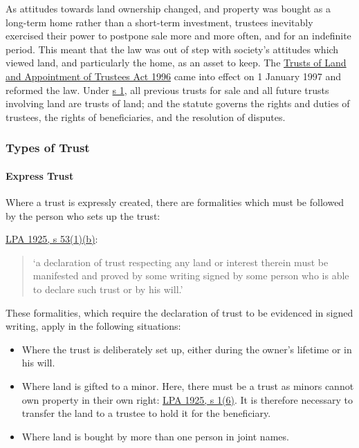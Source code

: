 \documentclass[
]{article}
\providecommand{\tightlist}{%
  \setlength{\itemsep}{0pt}\setlength{\parskip}{0pt}}
\begin{document}
As attitudes towards land ownership changed, and property was bought as
a long-term home rather than a short-term investment, trustees
inevitably exercised their power to postpone sale more and more often,
and for an indefinite period. This meant that the law was out of step
with society's attitudes which viewed land, and particularly the home,
as an asset to keep. The
\href{https://www.legislation.gov.uk/ukpga/1996/47/contents}{Trusts of
Land and Appointment of Trustees Act 1996} came into effect on 1 January
1997 and reformed the law. Under
\href{https://www.legislation.gov.uk/ukpga/1996/47/section/1}{s 1}, all
previous trusts for sale and all future trusts involving land are trusts
of land; and the statute governs the rights and duties of trustees, the
rights of beneficiaries, and the resolution of disputes.

\hypertarget{types-of-trust}{%
\subsubsection{Types of Trust}\label{types-of-trust}}

\hypertarget{express-trust}{%
\paragraph{Express Trust}\label{express-trust}}

Where a trust is expressly created, there are formalities which must be
followed by the person who sets up the trust:

\href{https://www.legislation.gov.uk/ukpga/Geo5/15-16/20/section/53}{LPA
1925, s 53(1)(b)}:

\begin{quote}
`a declaration of trust respecting any land or interest therein must be
manifested and proved by some writing signed by some person who is able
to declare such trust or by his will.'
\end{quote}

These formalities, which require the declaration of trust to be
evidenced in signed writing, apply in the following situations:

\begin{itemize}
\tightlist
\item
  Where the trust is deliberately set up, either during the owner's
  lifetime or in his will.
\item
  Where land is gifted to a minor. Here, there must be a trust as minors
  cannot own property in their own right:
  \href{https://www.legislation.gov.uk/ukpga/Geo5/15-16/20/section/1}{LPA
  1925, s 1(6)}. It is therefore necessary to transfer the land to a
  trustee to hold it for the beneficiary.
\item
  Where land is bought by more than one person in joint names.
\end{itemize}
\end{document}
